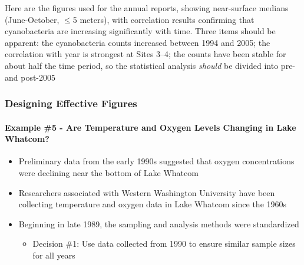 \documentclass[10pt]{beamer}
\newcommand{\bi}{\begin{itemize}}
\newcommand{\ei}{\end{itemize}}
\begin{document}
\begin{frame}
\begin{center}
\end{center}

\vspace{-2ex} {\scriptsize Here are the figures used for the annual
  reports, showing near-surface medians (June-October, $\le$5 meters),
  with correlation results confirming that cyanobacteria are
  increasing significantly with time. Three items should be apparent:
  the cyanobacteria counts increased between 1994 and 2005; the
  correlation with year is strongest at Sites 3--4; the counts have
  been stable for about half the time period, so the statistical
  analysis {\em should} be divided into pre- and post-2005\\}
\end{frame}

\begin{frame}
\frametitle{Designing Effective Figures}
\framesubtitle{Example \#5 - Are Temperature and Oxygen Levels Changing in Lake Whatcom?}

\bi
\item Preliminary data from the early 1990s suggested that oxygen
  concentrations were declining near the bottom of Lake Whatcom

\vspace{0.5ex}
\item Researchers associated with Western Washington University have
been collecting temperature and oxygen data in Lake Whatcom since the 1960s

\vspace{0.5ex}
\item  Beginning in late 1989, the sampling and analysis methods were standardized
  \bi
  \item {\color{red} Decision \#1:} Use data collected from 1990 to ensure similar sample sizes for all years
  \ei
\ei

\end{frame}
\end{document}
